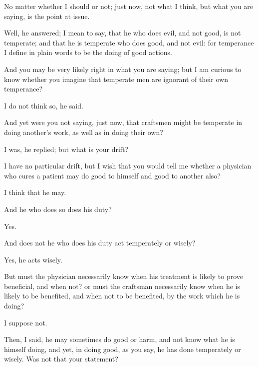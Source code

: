 \documentclass[11pt,letter]{article}
\begin{document}
\par  No matter whether I should or not; just now, not what I think, but what you are saying, is the point at issue.

\par  Well, he answered; I mean to say, that he who does evil, and not good, is not temperate; and that he is temperate who does good, and not evil: for temperance I define in plain words to be the doing of good actions.

\par  And you may be very likely right in what you are saying; but I am curious to know whether you imagine that temperate men are ignorant of their own temperance?

\par  I do not think so, he said.

\par  And yet were you not saying, just now, that craftsmen might be temperate in doing another's work, as well as in doing their own?

\par  I was, he replied; but what is your drift?

\par  I have no particular drift, but I wish that you would tell me whether a physician who cures a patient may do good to himself and good to another also?

\par  I think that he may.

\par  And he who does so does his duty?

\par  Yes.

\par  And does not he who does his duty act temperately or wisely?

\par  Yes, he acts wisely.

\par  But must the physician necessarily know when his treatment is likely to prove beneficial, and when not? or must the craftsman necessarily know when he is likely to be benefited, and when not to be benefited, by the work which he is doing?

\par  I suppose not.

\par  Then, I said, he may sometimes do good or harm, and not know what he is himself doing, and yet, in doing good, as you say, he has done temperately or wisely. Was not that your statement?
\end{document}
